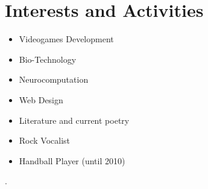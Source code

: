 \documentclass[a4paper,10pt]{article} %
\begin{document}
\section{Interests and Activities}

\begin{itemize}
  \item Videogames Development
  \item Bio-Technology
  \item Neurocomputation
  \item Web Design
  \item Literature and current poetry
  \item Rock Vocalist
  \item Handball Player (until 2010)
\end{itemize}
.
\end{document}

